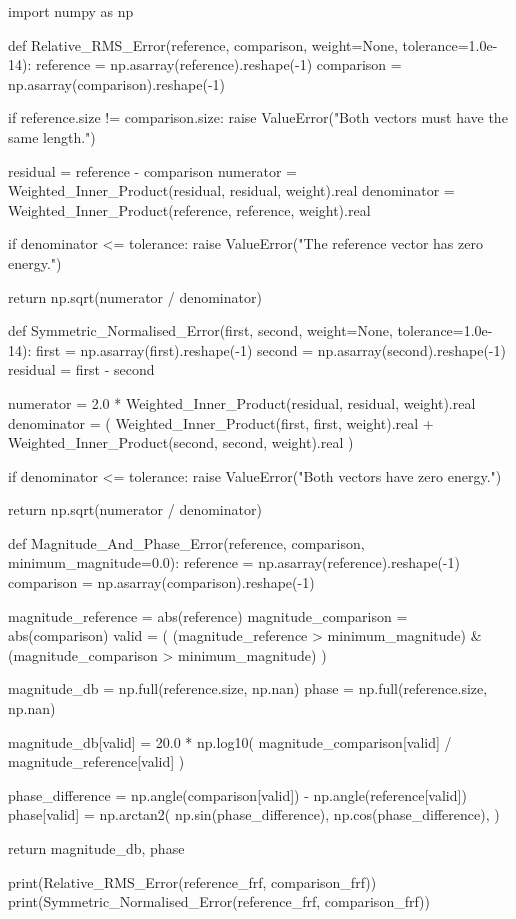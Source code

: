 \begin{python}
import numpy as np


def Relative_RMS_Error(reference, comparison, weight=None,
                       tolerance=1.0e-14):
    reference = np.asarray(reference).reshape(-1)
    comparison = np.asarray(comparison).reshape(-1)

    if reference.size != comparison.size:
        raise ValueError("Both vectors must have the same length.")

    residual = reference - comparison
    numerator = Weighted_Inner_Product(residual, residual, weight).real
    denominator = Weighted_Inner_Product(reference, reference, weight).real

    if denominator <= tolerance:
        raise ValueError("The reference vector has zero energy.")

    return np.sqrt(numerator / denominator)


def Symmetric_Normalised_Error(first, second, weight=None,
                               tolerance=1.0e-14):
    first = np.asarray(first).reshape(-1)
    second = np.asarray(second).reshape(-1)
    residual = first - second

    numerator = 2.0 * Weighted_Inner_Product(residual, residual, weight).real
    denominator = (
        Weighted_Inner_Product(first, first, weight).real
        + Weighted_Inner_Product(second, second, weight).real
    )

    if denominator <= tolerance:
        raise ValueError("Both vectors have zero energy.")

    return np.sqrt(numerator / denominator)


def Magnitude_And_Phase_Error(reference, comparison, minimum_magnitude=0.0):
    reference = np.asarray(reference).reshape(-1)
    comparison = np.asarray(comparison).reshape(-1)

    magnitude_reference = abs(reference)
    magnitude_comparison = abs(comparison)
    valid = (
        (magnitude_reference > minimum_magnitude)
        & (magnitude_comparison > minimum_magnitude)
    )

    magnitude_db = np.full(reference.size, np.nan)
    phase = np.full(reference.size, np.nan)

    magnitude_db[valid] = 20.0 * np.log10(
        magnitude_comparison[valid] / magnitude_reference[valid]
    )

    phase_difference = np.angle(comparison[valid]) - np.angle(reference[valid])
    phase[valid] = np.arctan2(
        np.sin(phase_difference),
        np.cos(phase_difference),
    )

    return magnitude_db, phase


print(Relative_RMS_Error(reference_frf, comparison_frf))
print(Symmetric_Normalised_Error(reference_frf, comparison_frf))
\end{python}

